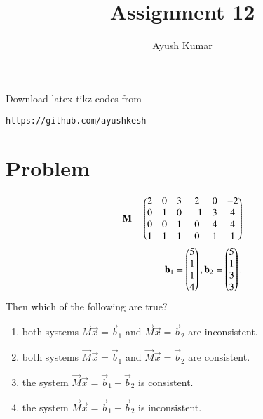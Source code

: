 \documentclass[journal,12pt]{IEEEtran}
\begin{document}
     \def\rightbox#1{\makebox[0in][r]{#1}}
     \def\centbox#1{\makebox[0in]{#1}}
     \def\topbox#1{\raisebox{-\baselineskip}[0in][0in]{#1}}
     \def\midbox#1{\raisebox{-0.5\baselineskip}[0in][0in]{#1}}
\vspace{3cm}
\title{Assignment 12}
\author{Ayush Kumar}
\maketitle
\bigskip
\renewcommand{\thefigure}{\theenumi}
\renewcommand{\thetable}{\theenumi}
Download latex-tikz codes from 
%
\begin{lstlisting}
https://github.com/ayushkesh
\end{lstlisting}
%
\section{\textbf{Problem}}
\begin{align}
\mathbf{M} = 
\begin{pmatrix}
2 & 0 & 3 & 2 & 0 & -2
\\
0 & 1 & 0 & -1 & 3 & 4
\\
0 & 0 & 1 & 0 & 4 & 4
\\
1 & 1 & 1 & 0 & 1 & 1
\end{pmatrix}
\\
\mathbf{b}_1 = \begin{pmatrix}5 \\ 1 \\ 1 \\ 4\end{pmatrix},
\mathbf{b}_2 = \begin{pmatrix}5 \\ 1 \\ 3 \\ 3\end{pmatrix}.
\end{align}  
Then which of the following are true?
\begin{enumerate}
\item both systems $\vec{M}\vec{x} = \vec{b}_1$ and $\vec{M}\vec{x} = \vec{b}_2$ are inconsistent.
\item both systems $\vec{M}\vec{x} = \vec{b}_1$ and $\vec{M}\vec{x} = \vec{b}_2$ are consistent. 
\item the system $\vec{M}\vec{x} = \vec{b}_1-\vec{b}_2$ is consistent. 
\item the system $\vec{M}\vec{x} = \vec{b}_1-\vec{b}_2$ is inconsistent. 
\end{enumerate}
%
\end{document}
